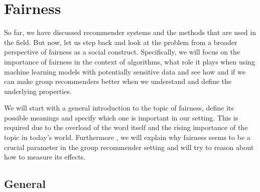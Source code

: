 \chapter{Fairness} \label{chap:fairness}

So far, we have discussed recommender systems and the methods that are used in the field. But now, let us step back and look at the problem from a broader perspective of fairness as a social construct. Specifically, we will focus on the importance of fairness in the context of algorithms, what role it plays when using machine learning models with potentially sensitive data and see how and if we can make group recommenders better when we understand and define the underlying properties.

We will start with a general introduction to the topic of fairness, define its possible meanings and specify which one is important in our setting.
This is required due to the overload of the word itself and the rising importance of the topic in today's world. Furthermore
, we will explain why fairness seems to be a crucial parameter in the group recommender setting and will try to reason about how to measure its effects.




\section{General} \label{sec:02_general}





